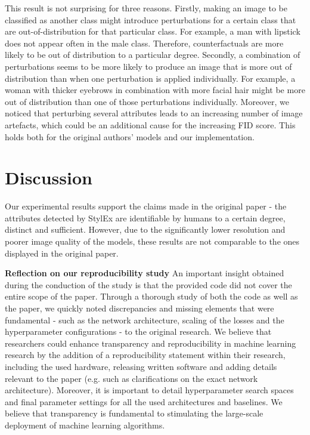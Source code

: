 This result is not surprising for three reasons. Firstly, making an image to be classified as another class might introduce perturbations for a certain class that are out-of-distribution for that particular class. For example, a man with lipstick does not appear often in the male class. Therefore, counterfactuals are more likely to be out of distribution to a particular degree. Secondly, a combination of perturbations seems to be more likely to produce an image that is more out of distribution than when one perturbation is applied individually. For example, a woman with thicker eyebrows in combination with more facial hair might be more out of distribution than one of those perturbations individually. Moreover, we noticed that perturbing several attributes leads to an increasing number of image artefacts, which could be an additional cause for the increasing FID score. This holds both for the original authors' models and our implementation.

\section{Discussion}

Our experimental results support the claims made in the original paper - the attributes detected by StylEx are identifiable by humans to a certain degree, distinct and sufficient. However, due to the significantly lower resolution and poorer image quality of the models, these results are not comparable to the ones displayed in the original paper.

\textbf{Reflection on our reproducibility study}
An important insight obtained during the conduction of the study is that the provided code did not cover the entire scope of the paper. Through a thorough study of both the code as well as the paper, we quickly noted discrepancies and missing elements that were fundamental - such as the network architecture, scaling of the losses and the hyperparameter configurations - to the original research.
We believe that researchers could enhance transparency and reproducibility in machine learning research by the addition of a reproducibility statement within their research, including the used hardware, releasing written software and adding details relevant to the paper (e.g. such as clarifications on the exact network architecture). Moreover, it is important to detail hyperparameter search spaces and final parameter settings for all the used architectures and baselines. We believe that transparency is fundamental to stimulating the large-scale deployment of machine learning algorithms.

